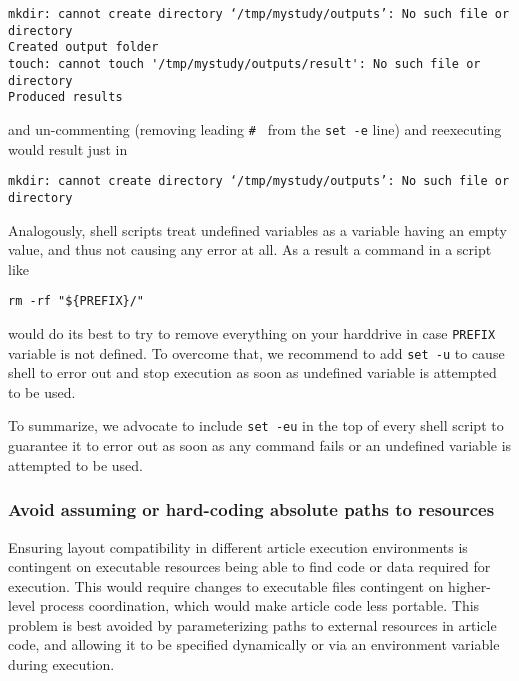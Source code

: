 \begin{verbatim}
mkdir: cannot create directory ‘/tmp/mystudy/outputs’: No such file or directory
Created output folder
touch: cannot touch '/tmp/mystudy/outputs/result': No such file or directory
Produced results
\end{verbatim}

and un-commenting (removing leading \texttt{\# } from the \texttt{set -e} line) and reexecuting would result just in

\begin{verbatim}
mkdir: cannot create directory ‘/tmp/mystudy/outputs’: No such file or directory
\end{verbatim}

Analogously, shell scripts treat undefined variables as a variable having an empty value, and thus not causing any error at all.
As a result a command in a script like

\begin{verbatim}
rm -rf "${PREFIX}/"
\end{verbatim}

would do its best to try to remove everything on your harddrive in case \texttt{PREFIX} variable is not defined.
To overcome that, we recommend to add \texttt{set -u} to cause shell to error out and stop execution as soon as undefined variable is attempted to be used.

To summarize, we advocate to include \texttt{set -eu} in the top of every shell script to guarantee it to error out as soon as any command fails or an undefined variable is attempted to be used.

\subsubsection{Avoid assuming or hard-coding absolute paths to resources}
Ensuring layout compatibility in different article execution environments is contingent on executable resources being able to find code or data required for execution.
This would require changes to executable files contingent on higher-level process coordination, which would make article code less portable.
This problem is best avoided by parameterizing paths to external resources in article code, and allowing it to be specified dynamically or via an environment variable during execution.

